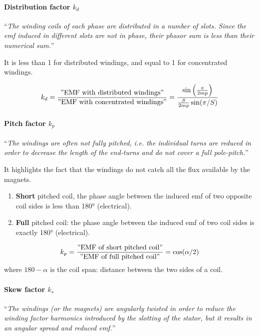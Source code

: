 \paragraph{Distribution factor $k_d$}

“\textit{The winding coils of each phase are distributed in a number of slots. Since the emf induced in different slots are not
in phase, their phasor sum is less than their numerical sum.}”

It is less than 1 for distributed windings, and equal to 1 for concentrated windings.

\[
    k_d = \frac{"\textrm{EMF with distributed windings}"}{"\textrm{EMF with concentrated windings}"} = \frac{\sin\left(\frac{\pi}{2mp}\right)}{\frac{S}{2mp}\sin(\pi/S)}
\]

\paragraph{Pitch factor $k_p$}

“\textit{The windings are often not fully pitched, i.e. the individual turns are reduced in order to decrease the length
of the end-turns and do not cover a full pole-pitch.}”

It highlights the fact that the windings do not catch all the flux available by the magnets.

\begin{enumerate}
    \item \textbf{Short} pitched coil, the phase angle between the induced emf of two opposite coil sides is less than 180°
(electrical).
    \item \textbf{Full} pitched coil: the phase angle between the induced emf of two coil sides is exactly 180° (electrical).
\end{enumerate}

\[
    k_p = \frac{"\textrm{EMF of short pitched coil}"}{"\textrm{EMF of full pitched coil}"} = \cos(\alpha/2)
\]
where $180-\alpha$ is the coil span: distance between the two sides of a coil.

\paragraph{Skew factor $k_s$}

“\textit{The windings (or the magnets) are angularly twisted in order to reduce the winding factor
harmonics introduced by the slotting of the stator, but it results in an angular spread and reduced emf.}”

